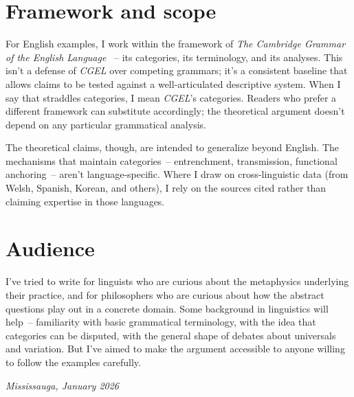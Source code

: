 \section*{Framework and scope}

For English examples, I work within the framework of \textit{The Cambridge Grammar of the English Language} \citep{huddleston2002}~-- its categories, its terminology, and its analyses. This isn't a defense of \textit{CGEL} over competing grammars; it's a consistent baseline that allows claims to be tested against a well-articulated descriptive system. When I say that  straddles categories, I mean \textit{CGEL}'s categories. Readers who prefer a different framework can substitute accordingly; the theoretical argument doesn't depend on any particular grammatical analysis.

The theoretical claims, though, are intended to generalize beyond English. The mechanisms that maintain categories~-- entrenchment, transmission, functional anchoring~-- aren't language-specific. Where I draw on cross-linguistic data (from Welsh, Spanish, Korean, and others), I rely on the sources cited rather than claiming expertise in those languages.

\section*{Audience}

I've tried to write for linguists who are curious about the metaphysics underlying their practice, and for philosophers who are curious about how the abstract questions play out in a concrete domain. Some background in linguistics will help~-- familiarity with basic grammatical terminology, with the idea that categories can be disputed, with the general shape of debates about universals and variation. But I've aimed to make the argument accessible to anyone willing to follow the examples carefully.


\bigskip

\noindent\textit{Mississauga, January 2026}
